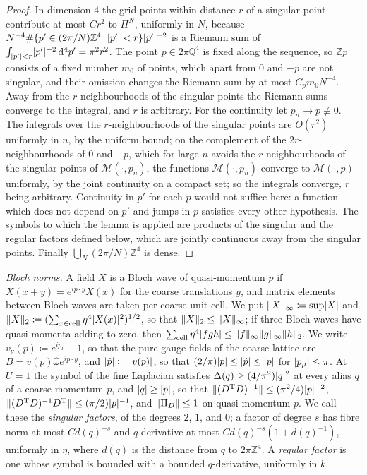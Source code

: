 \documentclass[11pt]{preprint}
\newcommand{\dd}{\mathrm{d}}
\DeclarePairedDelimiter{\abs}{\lvert}{\rvert}
\DeclarePairedDelimiter{\norm}{\lVert}{\rVert}
\numberwithin{equation}{section}
\theoremstyle{definition}
\theoremstyle{remark}
\theoremstyle{plain}
\begin{document}
\begin{proof}
In dimension $4$ the grid points within distance $r$ of a singular point contribute at most $Cr^2$ to $\Pi^N$, uniformly in $N$, because $N^{-4}\#\{ p' \in (2\pi/N)\mathbb Z^4 \, | \, \abs{p'} < r \}\abs{p'}^{-2}$ is a Riemann sum of $\int_{\abs{p'}<r}\abs{p'}^{-2}\,\dd^4p' = \pi^2r^2$. The point $p \in 2\pi\mathbb Q^4$ is fixed along the sequence, so $\mathbb Zp$ consists of a fixed number $m_0$ of points, which apart from $0$ and $-p$ are not singular, and their omission changes the Riemann sum by at most $C_pm_0N^{-4}$. Away from the $r$-neighbourhoods of the singular points the Riemann sums converge to the integral, and $r$ is arbitrary. For the continuity let $p_n \to p \not\equiv 0$. The integrals over the $r$-neighbourhoods of the singular points are $O(r^2)$ uniformly in $n$, by the uniform bound; on the complement of the $2r$-neighbourhoods of $0$ and $-p$, which for large $n$ avoids the $r$-neighbourhoods of the singular points of $\mathcal M(\cdot, p_n)$, the functions $\mathcal M(\cdot, p_n)$ converge to $\mathcal M(\cdot, p)$ uniformly, by the joint continuity on a compact set; so the integrals converge, $r$ being arbitrary. Continuity in $p'$ for each $p$ would not suffice here: a function which does not depend on $p'$ and jumps in $p$ satisfies every other hypothesis. The symbols to which the lemma is applied are products of the singular and the regular factors defined below, which are jointly continuous away from the singular points. Finally $\bigcup_N(2\pi/N)\mathbb Z^4$ is dense.
\end{proof}

\emph{Bloch norms.} A field $X$ is a Bloch wave of quasi-momentum $p$ if $X(x + y) = e^{ip\cdot y}X(x)$ for the coarse translations $y$, and matrix elements between Bloch waves are taken per coarse unit cell. We put $\norm{X}_\infty \coloneqq \sup\abs{X}$ and $\norm{X}_2 \coloneqq (\sum_{x \in \mathrm{cell}}\eta^4\abs{X(x)}^2)^{1/2}$, so that $\norm{X}_2 \leq \norm{X}_\infty$; if three Bloch waves have quasi-momenta adding to zero, then $\sum_{\mathrm{cell}}\eta^4\abs{fgh} \leq \norm{f}_\infty\norm{g}_\infty\norm{h}_2$. We write $v_\nu(p) \coloneqq e^{ip_\nu} - 1$, so that the pure gauge fields of the coarse lattice are $B = v(p)\hat\omega e^{ip\cdot y}$, and $\abs{\hat p} \coloneqq \abs{v(p)}$, so that $(2/\pi)\abs{p} \leq \abs{\hat p} \leq \abs{p}$ for $\abs{p_\mu} \leq \pi$. At $U = 1$ the symbol of the fine Laplacian satisfies $\Delta(q) \geq (4/\pi^2)\abs{q}^2$ at every alias $q$ of a coarse momentum $p$, and $\abs{q} \geq \abs{p}$, so that $\norm{(D^{\mathrm T}D)^{-1}} \leq (\pi^2/4)\abs{p}^{-2}$, $\norm{(D^{\mathrm T}D)^{-1}D^{\mathrm T}} \leq (\pi/2)\abs{p}^{-1}$, and $\norm{\Pi_D} \leq 1$ on quasi-momentum $p$. We call these the \emph{singular factors}, of the degrees $2$, $1$, and $0$; a factor of degree $s$ has fibre norm at most $Cd(q)^{-s}$ and $q$-derivative at most $Cd(q)^{-s}(1 + d(q)^{-1})$, uniformly in $\eta$, where $d(q)$ is the distance from $q$ to $2\pi\mathbb Z^4$. A \emph{regular factor} is one whose symbol is bounded with a bounded $q$-derivative, uniformly in $k$.
\end{document}
